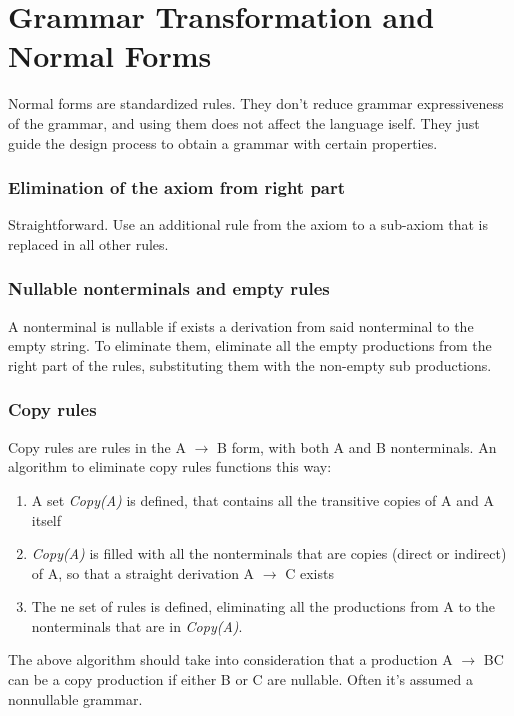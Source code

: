 	\section{Grammar Transformation and Normal Forms}
		Normal forms are standardized rules. They don't reduce grammar expressiveness of the grammar, and using them does not affect the language iself. They just 
		guide the design process to obtain a grammar with certain properties.

		\subsubsection{Elimination of the axiom from right part}
			Straightforward. Use an additional rule from the axiom to a sub-axiom that is replaced in all other rules.
		\subsubsection{Nullable nonterminals and empty rules}
			A nonterminal is nullable if exists a derivation from said nonterminal to the empty string. To eliminate them, eliminate all the empty productions 
			from the right part of the rules, substituting them with the non-empty sub productions.
		\subsubsection{Copy rules}
			Copy rules are rules in the A $\rightarrow$ B form, with both A and B nonterminals. An algorithm to eliminate copy rules functions this way:
			\begin{enumerate}
				\item A set \emph{Copy(A)} is defined, that contains all the transitive copies of A and A itself
				\item \emph{Copy(A)} is filled with all the nonterminals that are copies (direct or indirect) of A, so that a straight derivation A $\rightarrow$ C 
				exists
				\item The ne set of rules is defined, eliminating all the productions from A to the nonterminals that are in \emph{Copy(A)}.  
			\end{enumerate}
			The above algorithm should take into consideration that a production A $\rightarrow$ BC can be a copy production if either B or C are nullable. Often 
			it's assumed a nonnullable grammar.
